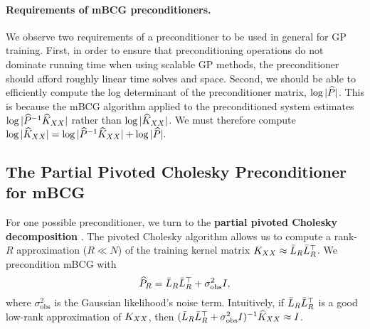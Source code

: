 


\paragraph{Requirements of mBCG preconditioners.}
We observe two requirements of a preconditioner to be used in general for GP training.
First, in order to ensure that preconditioning operations do not dominate running time when using scalable GP methods, the preconditioner should afford roughly linear time solves and space.
Second, we should be able to efficiently compute the log determinant of the preconditioner matrix, $\log \vert \widehat{P} \vert$.
This is because the mBCG algorithm applied to the preconditioned system estimates $\log \vert \widehat{P}^{-1}\widehat{K}_{XX} \vert$ rather than $\log \vert \widehat{K}_{XX} \vert$. We must therefore compute
$
  \label{eq:logdet_adjusted}
  \log \vert \widehat{K}_{XX} \vert = \log \vert \widehat{P}^{-1}\widehat{K}_{XX} \vert + \log \vert \widehat{P} \vert.
$




\subsection{The Partial Pivoted Cholesky Preconditioner for mBCG}

For one possible preconditioner, we turn to the {\bf partial pivoted Cholesky decomposition} \cite{harbrecht2012low}.
The pivoted Cholesky algorithm allows us to compute a rank-$R$ approximation ($R \ll N$) of the training kernel matrix $K_{XX} \approx \bar{L}_{R} \bar{L}_{R}^{\top}$.
We precondition mBCG with
\begin{equation}
  \widehat{P}_R = \bar{L}_{R} \bar{L}_{R}^\top + \sigma^2_\text{obs} I,
\end{equation}
where $\sigma_\text{obs}^2$ is the Gaussian likelihood's noise term.
Intuitively, if $\bar{L}_{R}\bar{L}_{R}^{\top}$ is a good low-rank approximation of $K_{XX}$, then $(\bar{L}_{R} \bar{L}_R^\top + \sigma_\text{obs}^{2}I)^{-1}\widehat{K}_{XX} \approx I$.


